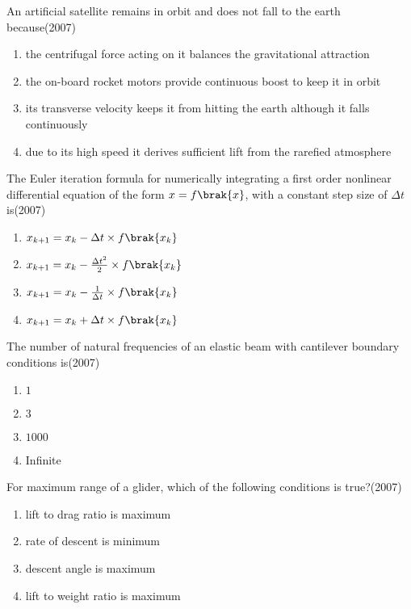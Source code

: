 \item An artificial satellite remains in orbit and does not fall to the earth because\hfill(2007)
\begin{enumerate}
\item the centrifugal force acting on it balances the gravitational attraction 
\item the on-board rocket motors provide continuous boost to keep it in orbit
\item its transverse velocity keeps it from hitting the earth although it falls continuously 
\item due to its high speed it derives sufficient lift from the rarefied atmosphere
\end{enumerate}


\item The Euler iteration formula for numerically integrating a first order nonlinear differential equation of the form $x=f\brak{x}$, with a constant step size of $\Delta t$ is\hfill(2007)
\begin{multicols}{2}
\begin{enumerate}
\item $x_{k+1}=x_{k}-\Delta t\times f\brak{x_{k}}$
\item $x_{k+1}=x_{k}-\frac{\Delta t^{2}}{2}\times f\brak{x_{k}}$
\item $x_{k+1}=x_{k}-\frac{1}{\Delta t}\times f\brak{x_{k}}$
\item $x_{k+1}=x_{k}+\Delta t\times f\brak{x_{k}}$
\end{enumerate}
\end{multicols}


\item The number of natural frequencies of an elastic beam with cantilever boundary conditions is\hfill(2007)
\begin{multicols}{2}
\begin{enumerate}
\item $1$
\item $3$
\item $1000$
\item Infinite
\end{enumerate}
\end{multicols}


\item For maximum range of a glider, which of the following conditions is true?\hfill(2007)
\begin{multicols}{2}
\begin{enumerate}
\item lift to drag ratio is maximum
\item rate of descent is minimum
\item descent angle is maximum
\item lift to weight ratio is maximum
\end{enumerate}
\end{multicols}


